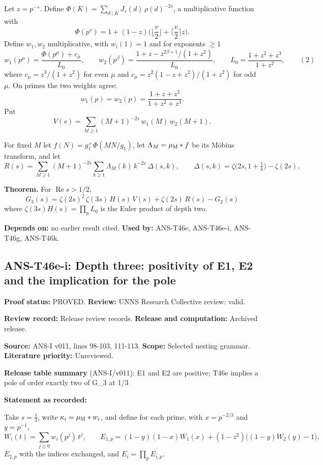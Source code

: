 \documentclass[
  11pt,
]{article}
\begin{document}
Let \(z=p^{-s}\). Define
\(\Phi(K)=\sum_{d\mid K}J_s(d)\,\rho(d)^{-2s}\), a multiplicative
function with
\[\Phi(p^v)=1+(1-z)\Big(\Big\lfloor\frac v2\Big\rfloor+\Big\lceil\frac v2\Big\rceil z\Big).\]
Define \(w_1,w_2\) multiplicative, with \(w_i(1)=1\) and for exponents
\(\ge1\)
\[w_1(p^\mu)=\frac{\Phi(p^\mu)+c_\mu}{L_0},\qquad w_2(p^\beta)=\frac{1+z-z^{2\beta+1}/(1+z^2)}{L_0},\qquad L_0=\frac{1+z^2+z^3}{1+z^2},\qquad(2)\]
where \(c_\mu=z^3/(1+z^2)\) for even \(\mu\) and
\(c_\mu=z^2(1-z+z^2)/(1+z^2)\) for odd \(\mu\). On primes the two
weights agree: \[w_1(p)=w_2(p)=\frac{1+z+z^2}{1+z^2+z^3}.\] Put
\[V(s)=\sum_{M\ge1}(M+1)^{-2s}\,w_1(M)\,w_2(M+1).\]

For fixed \(M\) let \(f(N)=g_1^{\,s}\,\Phi(MN/g_1)\), let
\(\Lambda_M=\mu_{\rm M}*f\) be its Möbius transform, and let
\[R(s)=\sum_{M\ge1}(M+1)^{-2s}\sum_{k\ge1}\Lambda_M(k)\,k^{-2s}\,\Delta(s,k),\qquad\Delta(s,k)=\zeta\big(2s,1+\tfrac1k\big)-\zeta(2s).\]

\textbf{Theorem.} For \(\operatorname{Re}s>1/2\),
\[\boxed{\,G_3(s)=\zeta(2s)^2\,\zeta(3s)\,H(s)\,V(s)+\zeta(2s)\,R(s)-G_2(s)\,}\]
where \(\zeta(3s)H(s)=\prod_pL_0\) is the Euler product of depth two.

\textbf{Depends on:} no earlier result cited. \textbf{Used by:}
ANS-T46e, ANS-T46e-i, ANS-T46g, ANS-T46k.

\hypertarget{ans-t46e-i-depth-three-positivity-of-e1-e2-and-the-implication-for-the-pole}{%
\subsection{ANS-T46e-i: Depth three: positivity of E1, E2 and the
implication for the
pole}\label{ans-t46e-i-depth-three-positivity-of-e1-e2-and-the-implication-for-the-pole}}

\textbf{Proof status:} PROVED. \textbf{Review:} UNNS Research Collective
review: valid.

\textbf{Review record:} Release review records. \textbf{Release and
computation:} Archived release.

\textbf{Source:} ANS-I v011, lines 98-103, 111-113. \textbf{Scope:}
Selected nesting grammar. \textbf{Literature priority:} Unreviewed.

\textbf{Release table summary} (ANS-I/v011): E1 and E2 are positive;
T46e implies a pole of order exactly two of G\_3 at 1/3

\textbf{Statement as recorded:}

Take \(s=\tfrac13\), write \(\kappa_i=\mu_{\rm M}*w_i\), and define for
each prime, with \(x=p^{-2/3}\) and \(y=p^{-1}\),
\[W_i(t)=\sum_{j\ge0}w_i(p^j)\,t^j,\qquad E_{1,p}=(1-y)(1-x)W_1(x)+(1-z^2)\big((1-y)W_2(y)-1\big),\]
\(E_{2,p}\) with the indices exchanged, and \(E_i=\prod_pE_{i,p}\).
\end{document}

